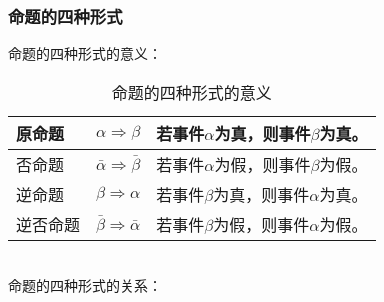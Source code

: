 \documentclass[UTF8]{ctexart}
\begin{document}
\subsubsection{命题的四种形式}
    命题的四种形式的意义：\vspace{3pt}
    \begin{table}[h!]
        \begin{center}
            \begin{tabular}{p{70pt}|p{70pt}|p{170pt}}
                \hline
                原命题&$\alpha\Rightarrow\beta$&若事件$\alpha$为真，则事件$\beta$为真。\\ \hline
                否命题&$\bar{\alpha}\Rightarrow\bar{\beta}$&若事件$\alpha$为假，则事件$\beta$为假。\\ \hline
                逆命题&$\beta\Rightarrow\alpha$&若事件$\beta$为真，则事件$\alpha$为真。\\ \hline
                逆否命题&$\bar{\beta}\Rightarrow\bar{\alpha}$&若事件$\beta$为假，则事件$\alpha$为假。\\ \hline
            \end{tabular}
            \caption{命题的四种形式的意义}
        \end{center}
    \end{table}\\
    命题的四种形式的关系：\vspace{5pt}
\end{document}

